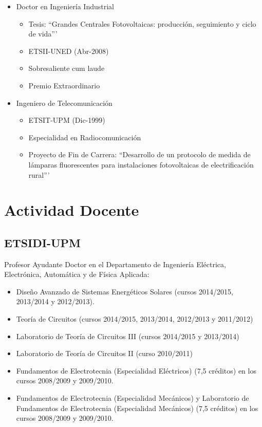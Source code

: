 \documentclass[article, a4paper]{memoir}
\begin{document}
\begin{itemize}
\item Doctor en Ingeniería Industrial
\begin{itemize}
\item Tesis: ``Grandes Centrales Fotovoltaicas: producción, seguimiento y ciclo de vida'''
\item ETSII-UNED (Abr-2008)
\item Sobresaliente cum laude
\item Premio Extraordinario
\end{itemize}

\item Ingeniero de Telecomunicación
\begin{itemize}
\item ETSIT-UPM (Dic-1999)
\item Especialidad en Radiocomunicación
\item Proyecto de Fin de Carrera: ``Desarrollo de un protocolo de medida de lámparas fluorescentes para instalaciones fotovoltaicas de electrificación rural'''
\end{itemize}
\end{itemize}


\section{Actividad Docente}
\label{sec-3}

\subsection{ETSIDI-UPM}
\label{sec-3-1}

Profesor Ayudante Doctor en el Departamento de Ingeniería Eléctrica, Electrónica, Automática y de Física Aplicada:

\begin{itemize}
\item Diseño Avanzado de Sistemas Energéticos Solares (cursos 2014/2015, 2013/2014 y 2012/2013).

\item Teoría de Circuitos (cursos 2014/2015, 2013/2014, 2012/2013 y 2011/2012)

\item Laboratorio de Teoría de Circuitos III (cursos 2014/2015 y 2013/2014)

\item Laboratorio de Teoría de Circuitos II (curso 2010/2011)

\item Fundamentos de Electrotecnia (Especialidad Eléctricos) (7,5 créditos) en los cursos 2008/2009 y 2009/2010.

\item Fundamentos de Electrotecnia (Especialidad Mecánicos) y Laboratorio de Fundamentos de Electrotecnia (Especialidad Mecánicos) (7,5 créditos) en los cursos 2008/2009 y 2009/2010.
\end{itemize}
\end{document}
